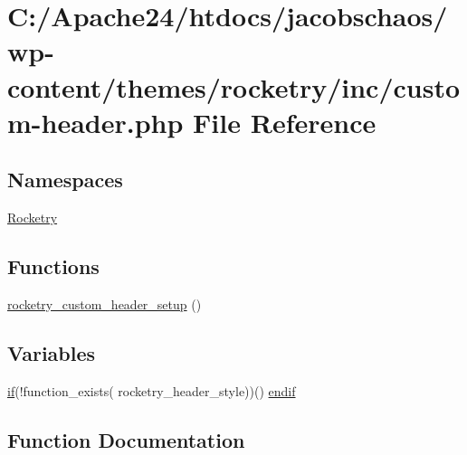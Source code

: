 \hypertarget{custom-header_8php}{}\section{C\+:/\+Apache24/htdocs/jacobschaos/wp-\/content/themes/rocketry/inc/custom-\/header.php File Reference}
\label{custom-header_8php}
\subsection*{Namespaces}
\begin{DoxyCompactItemize}
\item 
 \hyperlink{namespace_rocketry}{Rocketry}
\end{DoxyCompactItemize}
\subsection*{Functions}
\begin{DoxyCompactItemize}
\item 
\hyperlink{custom-header_8php_a10b408944393a11dbd69fc5058c87fe3}{rocketry\+\_\+custom\+\_\+header\+\_\+setup} ()
\end{DoxyCompactItemize}
\subsection*{Variables}
\begin{DoxyCompactItemize}
\item 
\hyperlink{skip-link-focus-fix_8js_abec33d9ccd80b36e9944d11422db042c}{if}(!function\+\_\+exists( \textquotesingle{}rocketry\+\_\+header\+\_\+style\textquotesingle{}))() \hyperlink{custom-header_8php_a36df02f026e959c219c864da9f74514c}{endif}
\end{DoxyCompactItemize}


\subsection{Function Documentation}
\hypertarget{custom-header_8php_a10b408944393a11dbd69fc5058c87fe3}{}
